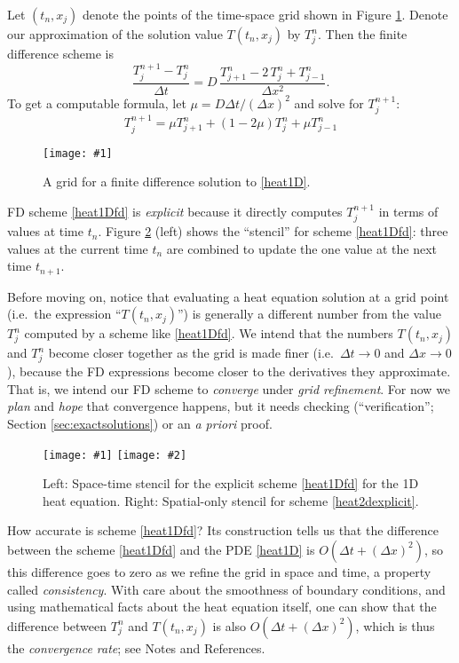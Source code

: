 \documentclass[letterpaper,final,12pt,reqno]{amsart}
\newcommand{\onefigsize}[3]{
\begin{figure}[ht]
\centering
\texttt{[image: \#1]}
\caption{#2}
\label{fig:#1}
\end{figure}}
\newcommand{\twofigsizes}[5]{
\begin{figure}[ht]
\centering
\texttt{[image: \#1]} \quad
\texttt{[image: \#2]}
\caption{#3}
\label{fig:#1}
\end{figure}}
\begin{document}
Let $(t_n,x_j)$ denote the points of the time-space grid shown in Figure \ref{fig:timespacegrid}.  Denote our approximation of the solution value $T(t_n,x_j)$ by $T_j^n$.  Then the finite difference scheme is
	$$\frac{T_j^{n+1} - T_j^n}{\Delta t} = D\,\frac{T_{j+1}^n - 2\, T_j^n + T_{j-1}^n}{\Delta x^2}.$$
To get a computable formula, let $\mu = D \Delta t / (\Delta x)^2$ and solve for $T_j^{n+1}$:
\begin{equation}
  T_j^{n+1} = \mu T_{j+1}^n + (1 - 2 \mu) T_j^n + \mu T_{j-1}^n \label{heat1Dfd}
\end{equation}

\onefigsize{timespacegrid}{A grid for a finite difference solution to \eqref{heat1D}.}{2.0in}

FD scheme \eqref{heat1Dfd} is \emph{explicit} because it directly computes $T_j^{n+1}$ in terms of values at time $t_n$.  Figure \ref{fig:expstencil} (left) shows the ``stencil'' for scheme \eqref{heat1Dfd}: three values at the current time $t_n$ are combined to update the one value at the next time $t_{n+1}$.

Before moving on, notice that evaluating a heat equation solution at a grid point (i.e.~the expression ``$T(t_n,x_j)$'') is generally a different number from the value $T_j^n$ computed by a scheme like \eqref{heat1Dfd}.  We intend that the numbers $T(t_n,x_j)$ and $T_j^n$ become closer together as the grid is made finer (i.e.~$\Delta t \to 0$ and $\Delta x \to 0$), because the FD expressions become closer to the derivatives they approximate.  That is, we intend our FD scheme to \emph{converge} under \emph{grid refinement}.  For now we \emph{plan} and \emph{hope} that convergence happens, but it needs checking (``verification''; Section \ref{sec:exactsolutions}) or an \emph{a priori} proof.

\twofigsizes{expstencil}{exp2dstencil}{Left: Space-time stencil for the explicit scheme \eqref{heat1Dfd} for the 1D heat equation.  Right: Spatial-only stencil for scheme \eqref{heat2dexplicit}.}{2.0in}{2.1in}

How accurate is scheme \eqref{heat1Dfd}?  Its construction tells us that the difference between the scheme \eqref{heat1Dfd} and the PDE \eqref{heat1D} is $O(\Delta t + (\Delta x)^2)$, so this difference goes to zero as we refine the grid in space and time, a property called \emph{consistency}.  With care about the smoothness of boundary conditions, and using mathematical facts about the heat equation itself, one can show that the difference between $T_j^n$ and $T(t_n,x_j)$ is also $O(\Delta t + (\Delta x)^2)$, which is thus the \emph{convergence rate}; see Notes and References.
\end{document}
